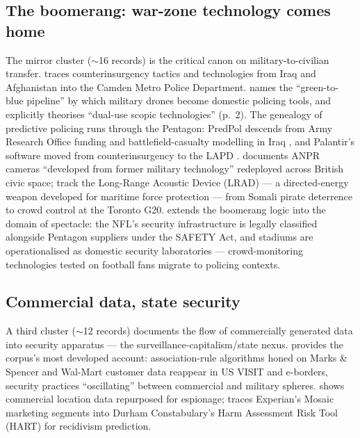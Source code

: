 \subsection{The boomerang: war-zone technology comes home}

The mirror cluster ($\sim$16 records) is the critical canon on military-to-civilian transfer. \textcite{wiig2018} traces counterinsurgency tactics and technologies from Iraq and Afghanistan into the Camden Metro Police Department. \textcite[p.~4]{wall2013} names the ``green-to-blue pipeline'' by which military drones become domestic policing tools, and explicitly theorises ``dual-use scopic technologies'' (p.~2). The genealogy of predictive policing runs through the Pentagon: PredPol descends from Army Research Office funding and battlefield-casualty modelling in Iraq \parencite{sharma2024,brayne2020}, and Palantir's software moved from counterinsurgency to the LAPD \parencite{brayne2020}. \textcite[p.~95]{coaffee2015} documents ANPR cameras ``developed from former military technology'' redeployed across British civic space; \textcite{kitchen2014} track the Long-Range Acoustic Device (LRAD) — a directed-energy weapon developed for maritime force protection — from Somali pirate deterrence to crowd control at the Toronto G20. \textcite{schimmel2021} extends the boomerang logic into the domain of spectacle: the NFL's security infrastructure is legally classified alongside Pentagon suppliers under the SAFETY Act, and stadiums are operationalised as domestic security laboratories — crowd-monitoring technologies tested on football fans migrate to policing contexts.

\subsection{Commercial data, state security}

A third cluster ($\sim$12 records) documents the flow of commercially generated data into security apparatus — the surveillance-capitalism/state nexus. \textcite[p.~50]{amoore2009} provides the corpus's most developed account: association-rule algorithms honed on Marks \& Spencer and Wal-Mart customer data reappear in US VISIT and e-borders, security practices ``oscillating'' between commercial and military spheres. \textcite{wilhelmsen2022} shows commercial location data repurposed for espionage; \textcite{bigbrotherwatch2019} traces Experian's Mosaic marketing segments into Durham Constabulary's Harm Assessment Risk Tool (HART) for recidivism prediction.

